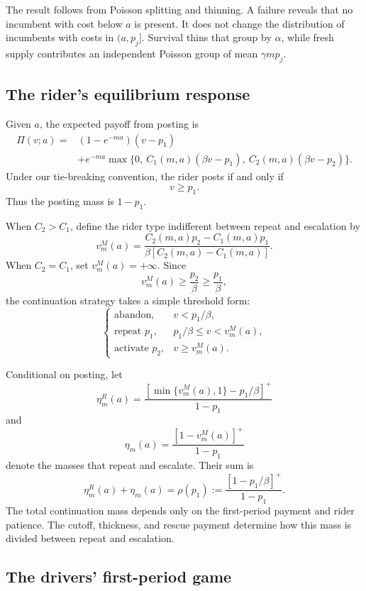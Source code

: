 \documentclass[11pt]{article}
\theoremstyle{definition}
\theoremstyle{remark}
\begin{document}
The result follows from Poisson splitting and thinning.  A failure reveals
that no incumbent with cost below \(a\) is present.  It does not change the
distribution of incumbents with costs in \((a,p_j]\).  Survival thins that
group by \(\alpha\), while fresh supply contributes an independent Poisson
group of mean \(\gamma m p_j\).

\subsection{The rider's equilibrium response}

Given \(a\), the expected payoff from posting is
\[
\begin{aligned}
\Pi(v;a)
={}&(1-e^{-ma})(v-p_1)\\
&+e^{-ma}
\max\bigl\{
0,\ C_1(m,a)(\beta v-p_1),\
C_2(m,a)(\beta v-p_2)
\bigr\}.
\end{aligned}
\]
Under our tie-breaking convention, the rider posts if and only if
\[
  v\ge p_1.
\]
Thus the posting mass is \(1-p_1\).

When \(C_2>C_1\), define the rider type indifferent between repeat and
escalation by
\[
  v_m^M(a)
  =
  \frac{C_2(m,a)p_2-C_1(m,a)p_1}
       {\beta[C_2(m,a)-C_1(m,a)]}.
\]
When \(C_2=C_1\), set \(v_m^M(a)=+\infty\).  Since
\[
  v_m^M(a)\ge\frac{p_2}{\beta}\ge\frac{p_1}{\beta},
\]
the continuation strategy takes a simple threshold form:
\[
\begin{cases}
\text{abandon}, & v<p_1/\beta,\\
\text{repeat }p_1, & p_1/\beta\le v<v_m^M(a),\\
\text{activate }p_2, & v\ge v_m^M(a).
\end{cases}
\]

Conditional on posting, let
\[
  \eta_m^R(a)
  =
  \frac{[\min\{v_m^M(a),1\}-p_1/\beta]^+}{1-p_1}
\]
and
\[
  \eta_m(a)
  =
  \frac{[1-v_m^M(a)]^+}{1-p_1}
\]
denote the masses that repeat and escalate.  Their sum is
\[
  \eta_m^R(a)+\eta_m(a)
  =
  \rho(p_1)
  :=
  \frac{[1-p_1/\beta]^+}{1-p_1}.
\]
The total continuation mass depends only on the first-period payment and
rider patience.  The cutoff, thickness, and rescue payment determine how this
mass is divided between repeat and escalation.

\subsection{The drivers' first-period game}
\end{document}
